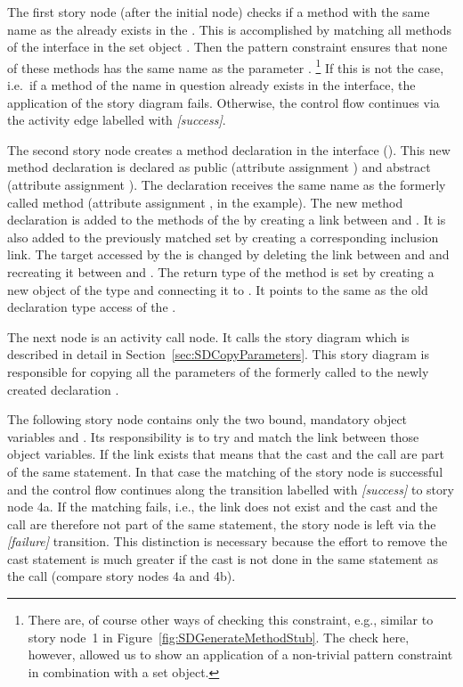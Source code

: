 The first story node (after the initial node) checks if a method with the same name as the  already exists in the .
This is accomplished by matching all methods of the interface in the set object .
Then the pattern constraint ensures that none of these methods has the same name as the parameter . \footnote{There are, of course other ways of checking this constraint, e.g., similar to story node~1 in Figure~\ref{fig:SDGenerateMethodStub}. The check here, however, allowed us to show an application of a non-trivial pattern constraint in combination with a set object.}
If this is not the case, i.e.\ if a method of the name in question already exists in the interface, the application of the story diagram fails.
Otherwise, the control flow continues via the activity edge labelled with \emph{[success]}.

The second story node creates a method declaration in the interface (). This new method declaration is declared as public (attribute assignment ) and abstract (attribute assignment ). The declaration receives the same name as the formerly called method (attribute assignment ,  in the example). The new method declaration is added to the methods of the  by creating a  link between  and . It is also added to the previously matched set  by creating a corresponding inclusion link. The target accessed by the  is changed by deleting the link between  and  and recreating it between  and . The return type of the method is set by creating a new object  of the type  and connecting it to . It points to the same  as the old declaration type access of the .

The next node is an activity call node. It calls the story diagram  which is described in detail in Section~\ref{sec:SDCopyParameters}. This story diagram is responsible for copying all the parameters of the formerly called  to the newly created declaration .

The following story node contains only the two bound, mandatory object variables  and . Its responsibility is to try and match the link  between those object variables. If the link exists that means that the cast and the call are part of the same statement. In that case the matching of the story node is successful and the control flow continues along the transition labelled with \emph{[success]} to story node 4a. If the matching fails, i.e., the link does not exist and the cast and the call are therefore not part of the same statement, the story node is left via the \emph{[failure]} transition. This distinction is necessary because the effort to remove the cast statement is much greater if the cast is not done in the same statement as the call (compare story nodes 4a and 4b).

